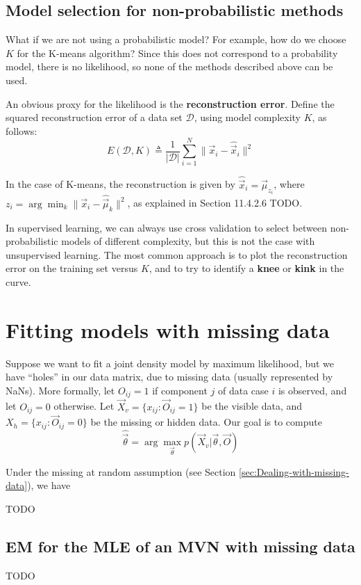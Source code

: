 \subsection{Model selection for non-probabilistic methods}
What if we are not using a probabilistic model? For example, how do we choose $K$ for the K-means algorithm? Since this does not correspond to a probability model, there is no likelihood, so none of the methods described above can be used.

An obvious proxy for the likelihood is the \textbf{reconstruction error}. Define the squared reconstruction error of a data set $\mathcal{D}$, using model complexity $K$, as follows:
\begin{equation}
E(\mathcal{D}, K) \triangleq \frac{1}{|\mathcal{D}|}\sum\limits_{i=1}^N \lVert\vec{x}_i-\hat{\vec{x}}_i\rVert^2
\end{equation}

In the case of K-means, the reconstruction is given by $\hat{\vec{x}}_i=\vec{\mu}_{z_i}$, where $z_i=\arg\min_k \lVert\vec{x}_i-\hat{\vec{\mu}}_k\rVert^2$, as explained in Section 11.4.2.6 TODO.

In supervised learning, we can always use cross validation to select between non-probabilistic models of different complexity, but this is not the case with unsupervised learning. The most common approach is to plot the reconstruction error on the training set versus $K$, and to try to identify a \textbf{knee} or \textbf{kink} in the curve. 


\section{Fitting models with missing data}
Suppose we want to fit a joint density model by maximum likelihood, but we have “holes” in our data matrix, due to missing data (usually represented by NaNs). More formally, let $O_{ij} =1$ if component $j$ of data case $i$ is observed, and let $O_{ij} =0$ otherwise. Let $\vec{X}_v=\{x_{ij}: \vec{O}_{ij} =1\}$ be the visible data, and $X_h=\{x_{ij}: \vec{O}_{ij} =0\}$ be the missing or hidden data. Our goal is to compute
\begin{equation}
\hat{\vec{\theta}}=\arg\max_{\vec{\theta}} p(\vec{X}_v|\vec{\theta}, \vec{O})
\end{equation}

Under the missing at random assumption (see Section \ref{sec:Dealing-with-missing-data}), we have

TODO

\subsection{EM for the MLE of an MVN with missing data}
TODO
